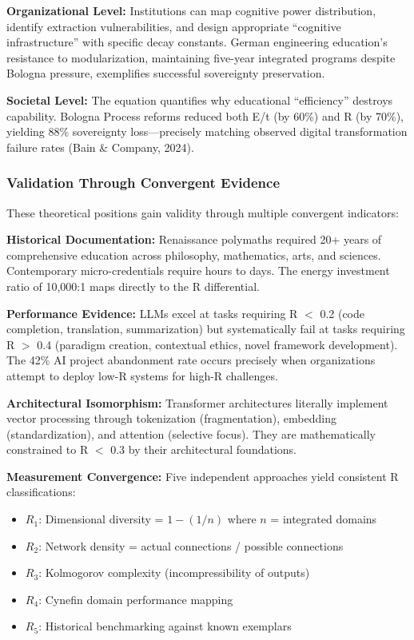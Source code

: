 \textbf{Organizational Level:} Institutions can map cognitive power distribution, identify extraction vulnerabilities, and design appropriate ``cognitive infrastructure'' with specific decay constants. German engineering education's resistance to modularization, maintaining five-year integrated programs despite Bologna pressure, exemplifies successful sovereignty preservation.

\textbf{Societal Level:} The equation quantifies why educational ``efficiency'' destroys capability. Bologna Process reforms reduced both E/t (by 60\%) and R (by 70\%), yielding 88\% sovereignty loss---precisely matching observed digital transformation failure rates (Bain \& Company, 2024).

\subsubsection{Validation Through Convergent Evidence}

These theoretical positions gain validity through multiple convergent indicators:

\textbf{Historical Documentation:} Renaissance polymaths required 20+ years of comprehensive education across philosophy, mathematics, arts, and sciences. Contemporary micro-credentials require hours to days. The energy investment ratio of 10,000:1 maps directly to the R differential.

\textbf{Performance Evidence:} LLMs excel at tasks requiring R $<$ 0.2 (code completion, translation, summarization) but systematically fail at tasks requiring R $>$ 0.4 (paradigm creation, contextual ethics, novel framework development). The 42\% AI project abandonment rate occurs precisely when organizations attempt to deploy low-R systems for high-R challenges.

\textbf{Architectural Isomorphism:} Transformer architectures literally implement vector processing through tokenization (fragmentation), embedding (standardization), and attention (selective focus). They are mathematically constrained to R $<$ 0.3 by their architectural foundations.

\textbf{Measurement Convergence:} Five independent approaches yield consistent R classifications:
\begin{itemize}
\item $R_1$: Dimensional diversity = $1 - (1/n)$ where $n$ = integrated domains
\item $R_2$: Network density = actual connections / possible connections
\item $R_3$: Kolmogorov complexity (incompressibility of outputs)
\item $R_4$: Cynefin domain performance mapping
\item $R_5$: Historical benchmarking against known exemplars
\end{itemize}

